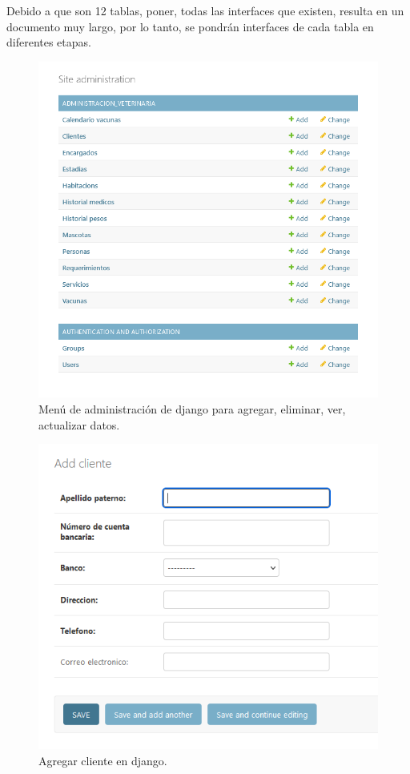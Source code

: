 \documentclass[
  12pt,
  hidelinks,
  a4paper,
  headings=standardclasses,
  headings=big,
  spanish
]{scrartcl}
\begin{document}
Debido a que son 12 tablas, poner, todas las interfaces que existen, resulta en un documento muy largo, por lo tanto, se pondrán interfaces de cada tabla en diferentes etapas.

\begin{figure}[H]
  \centering
  \includegraphics[width=\textwidth]{djago-menu.png}
  \caption[Menú django]{Menú de administración de django para agregar, eliminar, ver, actualizar datos.}
\end{figure}

\begin{figure}[H]
  \centering
  \includegraphics[width=\textwidth]{django-cliente-add.png}
  \caption{Agregar cliente en django.}
\end{figure}
\end{document}
